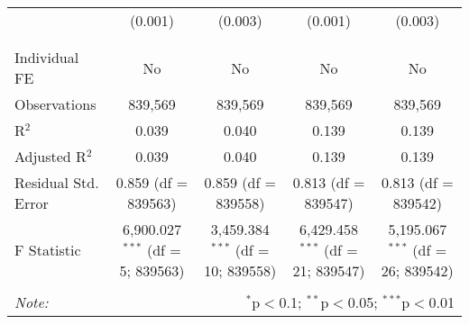 \documentclass[
]{article}
\begin{document}
\begin{table}[!htbp]
{\begin{tabular}{@{\extracolsep{5pt}}lcccc}
  & (0.001) & (0.003) & (0.001) & (0.003) \\ 
  & & & & \\ 
\hline \\[-1.8ex] 
Individual FE & No & No & No & No \\ 
Observations & 839,569 & 839,569 & 839,569 & 839,569 \\ 
R$^{2}$ & 0.039 & 0.040 & 0.139 & 0.139 \\ 
Adjusted R$^{2}$ & 0.039 & 0.040 & 0.139 & 0.139 \\ 
Residual Std. Error & 0.859 (df = 839563) & 0.859 (df = 839558) & 0.813 (df = 839547) & 0.813 (df = 839542) \\ 
F Statistic & 6,900.027$^{***}$ (df = 5; 839563) & 3,459.384$^{***}$ (df = 10; 839558) & 6,429.458$^{***}$ (df = 21; 839547) & 5,195.067$^{***}$ (df = 26; 839542) \\ 
\hline 
\hline \\[-1.8ex] 
\textit{Note:}  & \multicolumn{4}{r}{$^{*}$p$<$0.1; $^{**}$p$<$0.05; $^{***}$p$<$0.01} \\ 
\end{tabular}
} 
\end{table} 
\newpage
\end{document}
